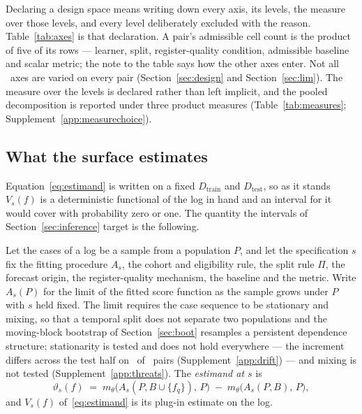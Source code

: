 

Declaring a design space means writing down every axis, its levels, the
measure over those levels, and every level deliberately excluded with the
reason. Table~\ref{tab:axes} is that declaration. A pair's admissible cell
count is the product of five of its rows --- learner, split, register-quality
condition, admissible baseline and scalar metric; the note to the table says
how the other axes enter. Not all \nAxes\ axes are varied on every pair
(Section~\ref{sec:design} and Section~\ref{sec:lim}). The measure over the
levels is declared rather than left implicit, and the pooled decomposition is
reported under three product measures (Table~\ref{tab:measures};
Supplement~\ref{app:measurechoice}).

\subsection{What the surface estimates}
\label{sec:estimand}

Equation~\eqref{eq:estimand} is written on a fixed $D_{\mathrm{train}}$ and
$D_{\mathrm{test}}$, so as it stands $V_s(f)$ is a deterministic functional of
the log in hand and an interval for it would cover with probability zero or
one. The quantity the intervals of Section~\ref{sec:inference} target is the
following.

\begin{definition}
\label{def:estimand}
Let the cases of a log be a sample from a population $P$, and let the
specification $s$ fix the fitting procedure $A_s$, the cohort and eligibility
rule, the split rule $\Pi$, the forecast origin, the register-quality mechanism,
the baseline and the metric. Write $A_s(P)$ for the limit of the fitted
score function as the sample grows under $P$ with $s$ held fixed. The limit
requires the case sequence to be stationary and mixing, so that a temporal
split does not separate two populations and the moving-block bootstrap of
Section~\ref{sec:boot} resamples a persistent dependence structure;
stationarity is tested and does not hold everywhere --- the increment
differs across the test half on \nDrifts\ of \nDriftPairs\ pairs
(Supplement~\ref{app:drift}) --- and mixing is not tested
(Supplement~\ref{app:threats}). The \emph{estimand at $s$} is
\[
\vartheta_s(f) \;=\; m_\theta\bigl(A_s(P, B \cup \{f_q\}),\, P\bigr)
\;-\; m_\theta\bigl(A_s(P, B),\, P\bigr),
\]
and $V_s(f)$ of~\eqref{eq:estimand} is its plug-in estimate on the log.
\end{definition}

